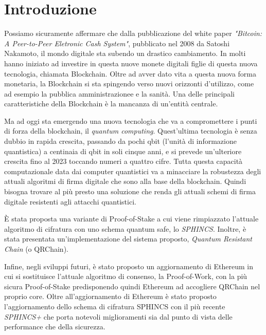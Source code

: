 \chapter*{Introduzione}
Possiamo sicuramente affermare che dalla pubblicazione del white paper \textit{"Bitcoin: A Peer-to-Peer Eletronic Cash System"}, pubblicato nel 2008 da Satoshi Nakamoto, il mondo digitale sta subendo un drastico cambiamento. In molti hanno iniziato ad investire in questa nuove monete digitali figlie di questa nuova tecnologia, chiamata Blockchain. Oltre ad avver dato vita a questa nuova forma monetaria, la Blockchain si sta spingendo verso nuovi orizzonti d'utilizzo, come ad esempio la pubblica amministrazionee e la sanità. Una delle principali caratteristiche della Blockchain è la mancanza di un'entità centrale.

Ma ad oggi sta emergendo una nuova tecnologia che va a compromettere i punti di forza della blockchain, il \textit{quantum computing}. Quest'ultima tecnologia è senza dubbio in rapida crescita, passando da pochi qbit (l'unità di informazione quantistica) a centinaia di qbit in soli cinque anni, e si prevede un'ulteriore crescita fino al 2023 toccando numeri a quattro cifre. Tutta questa capacità computazionale data dai computer quantistici va a minacciare la robustezza degli attuali algoritmi di firma digitale che sono alla base della blockchain. Quindi bisogna trovare al più presto una soluzione che renda gli attuali schemi di firma digitale resistenti agli attacchi quantistici.

È stata proposta una variante di Proof-of-Stake a cui viene rimpiazzato l'attuale algoritmo di cifratura con uno schema quantum safe, lo \textit{SPHINCS}. Inoltre, è stata presentata un'implementazione del sistema proposto, \textit{Quantum Resistant Chain} (o QRChain).

Infine, negli sviluppi futuri, è stato proposto un aggiornamento di Ethereum in cui si sostituisce l'attuale algoritmo di consenso, la Proof-of-Work, con la più sicura Proof-of-Stake predisponendo quindi Ethereum ad accogliere QRChain nel proprio core. Oltre all'aggiornamento di Ethereum è stato proposto l'aggiornamento dello schema di cifratura SPHINCS con il più recente \textit{SPHINCS+} che porta notevoli miglioramenti sia dal punto di vista delle performance che della sicurezza.


